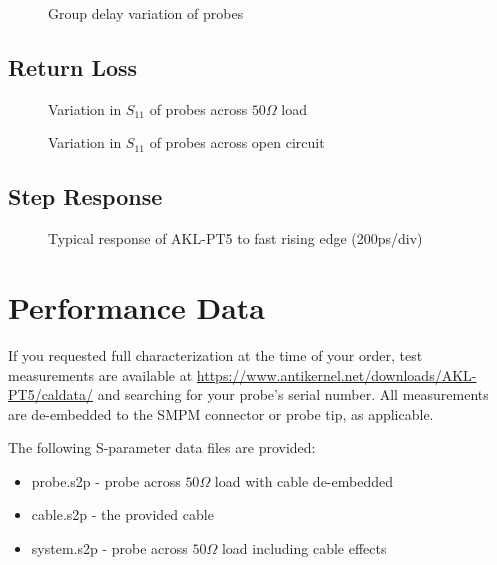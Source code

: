 \documentclass[11pt]{article}
\begin{document}
\begin{figure}[h]
\centering
\caption{Group delay variation of probes}
\label{typical-groupdelay}
\end{figure}
\FloatBarrier

\pagebreak
\subsection{Return Loss}

\begin{figure}[h!]
\centering
\caption{Variation in $S_{11}$ of probes across $50\Omega$ load}
\label{s11-open-variation}
\end{figure}

\begin{figure}[h!]
\centering
\caption{Variation in $S_{11}$ of probes across open circuit}
\label{s11-variation}
\end{figure}

\FloatBarrier

\pagebreak
\subsection{Step Response}

\begin{figure}[h!]
\centering
\caption{Typical response of AKL-PT5 to fast rising edge (200ps/div)}
\label{step-response}
\end{figure}

\FloatBarrier

\pagebreak
\section{Performance Data}

If you requested full characterization at the time of your order, test measurements are available at
\url{https://www.antikernel.net/downloads/AKL-PT5/caldata/} and searching for your probe's serial number. All
measurements are de-embedded to the SMPM connector or probe tip, as applicable.

The following S-parameter data files are provided:
\begin{itemize}
\item probe.s2p - probe across $50 \Omega$ load with cable de-embedded
\item cable.s2p - the provided cable
\item system.s2p - probe across $50 \Omega$ load including cable effects
\end{itemize}
\end{document}
